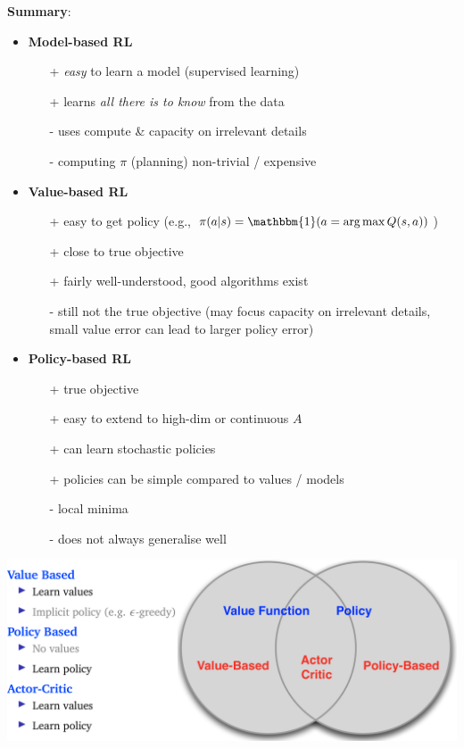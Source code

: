 \documentclass[10pt,landscape]{article}
\begin{document}
\begin{multicols}{3}
\newpage
\textbf{Summary}:
\begin{itemize}[leftmargin=4.5mm]
\item \textbf{Model-based RL} 
\begin{itemize}[leftmargin=2.5mm]
\item[+] \textit{easy} to learn a model (supervised learning)
\item[+] learns \textit{all there is to know} from the data
\item[-] uses compute \& capacity on irrelevant details
\item[-] computing $\pi$ (planning) non-trivial / expensive
\end{itemize}
\item \textbf{Value-based RL}
\begin{itemize}[leftmargin=2.5mm]
\item[+] easy to get policy (e.g., $\pi(a|s) = \mathbbm{1}(a = \arg\max Q(s, a))$)
\item[+] close to true objective
\item[+] fairly well-understood, good algorithms exist
\item[-] still not the true objective (may focus capacity on irrelevant details, small value error can lead to larger policy error)
\end{itemize}
\item \textbf{Policy-based RL}
\begin{itemize}[leftmargin=2.5mm]
\item[+] true objective
\item[+] easy to extend to high-dim or continuous $A$
\item[+] can learn stochastic policies
\item[+] policies can be simple compared to values / models
\item[-] local minima
\item[-] does not always generalise well
\end{itemize}
\end{itemize}

\includegraphics[width=\linewidth]{./images/actorcritics.png}


\end{multicols}
\end{document}
